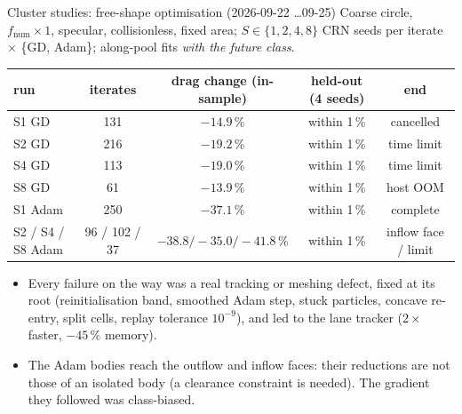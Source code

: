 \documentclass[10pt,aspectratio=169]{beamer}
\begin{document}
\begin{frame}{Cluster studies:  free-shape optimisation (2026-09-22 \dots 09-25)}
\footnotesize
Coarse circle, $f_{\mathrm{num}}\times1$, specular, collisionless, fixed area; $S\in\{1,2,4,8\}$
CRN seeds per iterate $\times$ \{GD, Adam\}; along-pool fits \emph{with the future class}.
\begin{center}
\begin{tabular}{@{}lcccc@{}}
\toprule
run & iterates & drag change (in-sample) & held-out (4 seeds) & end\\
\midrule
S1 GD & 131 & $-14.9\,\%$ & within 1\,\% & cancelled\\
S2 GD & 216 & $-19.2\,\%$ & within 1\,\% & time limit\\
S4 GD & 113 & $-19.0\,\%$ & within 1\,\% & time limit\\
S8 GD & 61 & $-13.9\,\%$ & within 1\,\% & host OOM\\
S1 Adam & 250 & $-37.1\,\%$ & within 1\,\% & complete\\
S2 / S4 / S8 Adam & 96 / 102 / 37 & $-38.8 / -35.0 / -41.8\,\%$ & within 1\,\% & inflow face / limit\\
\bottomrule
\end{tabular}
\end{center}
\begin{itemize}
\item Every failure on the way was a real tracking or meshing defect, fixed at its root (reinitialisation
  band, smoothed Adam step, stuck particles, concave re-entry, split cells, replay tolerance $10^{-9}$),
  and led to the lane tracker ($2\times$ faster, $-45\,\%$ memory).
\item The Adam bodies reach the outflow and inflow faces: their reductions are not those of an
  isolated body (a clearance constraint is needed).  The gradient they followed was class-biased.
\end{itemize}
\end{frame}
\end{document}
